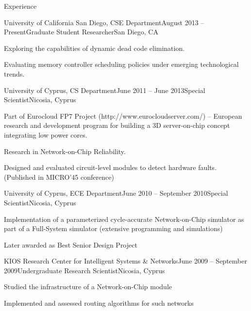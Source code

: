 \documentclass{resume} %
\begin{document}
\begin{rSection}{Experience}

\begin{rSubsection}{University of California San Diego, CSE Department}{August 2013 -- Present}{Graduate Student Researcher}{San Diego, CA}
	\item Exploring the capabilities of dynamic dead code elimination.
	\item Evaluating memory controller scheduling policies under emerging technological trends.
\end{rSubsection}


\begin{rSubsection}{University of Cyprus, CS Department}{June 2011 -- June 2013}{Special Scientist}{Nicosia, Cyprus}
	\item Part of Eurocloud FP7 Project (http://www.eurocloudserver.com/) -- European research and development program for building a 3D server-on-chip concept integrating low power cores.
	\item Research in Network-on-Chip Reliability.
	\item Designed and evaluated circuit-level modules to detect hardware faults. (Published in MICRO'45 conference)
\end{rSubsection}


\begin{rSubsection}{University of Cyprus, ECE Department}{June 2010 -- September 2010}{Special Scientist}{Nicosia, Cyprus}
	\item Implementation of a parameterized cycle-accurate Network-on-Chip simulator as part of a Full-System simulator (extensive programming and simulations)
	\item Later awarded as Best Senior Design Project
\end{rSubsection}


\begin{rSubsection}{KIOS Research Center for Intelligent Systems \& Networks}{June 2009 -- September 2009}{Undergraduate Research Scientist}{Nicosia, Cyprus}
	\item Studied the infrastructure of a Network-on-Chip module
	\item Implemented and assessed routing algorithms for such networks
\end{rSubsection}

\end{rSection}
\end{document}
